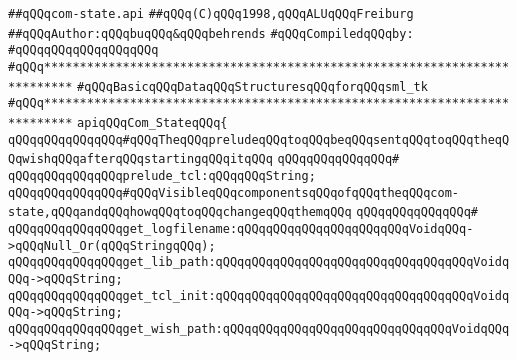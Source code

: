 \label{src/lib/tk/src/com-state.api}
\verb|##qQQqcom-state.api|\newline
\verb|##qQQq(C)qQQq1998,qQQqALUqQQqFreiburg|\newline
\verb|##qQQqAuthor:qQQqbuqQQq&qQQqbehrends|\newline
\newline
\verb|#qQQqCompiledqQQqby:|\newline
\verb|#qQQqqQQqqQQqqQQqqQQq|\newline
\newline
\newline
\newline
\verb|#qQQq**************************************************************************|\newline
\verb|#qQQqBasicqQQqDataqQQqStructuresqQQqforqQQqsml_tk|\newline
\verb|#qQQq**************************************************************************|\newline
\newline
\newline
\newline
\verb|apiqQQqCom_StateqQQq{|\newline
\newline
\newline
\verb|qQQqqQQqqQQqqQQq#qQQqTheqQQqpreludeqQQqtoqQQqbeqQQqsentqQQqtoqQQqtheqQQqwishqQQqafterqQQqstartingqQQqitqQQq|\newline
\verb|qQQqqQQqqQQqqQQq#|\newline
\verb|qQQqqQQqqQQqqQQqprelude_tcl:qQQqqQQqString;|\newline
\newline
\verb|qQQqqQQqqQQqqQQq#qQQqVisibleqQQqcomponentsqQQqofqQQqtheqQQqcom-state,qQQqandqQQqhowqQQqtoqQQqchangeqQQqthemqQQq|\newline
\verb|qQQqqQQqqQQqqQQq#|\newline
\verb|qQQqqQQqqQQqqQQqget_logfilename:qQQqqQQqqQQqqQQqqQQqqQQqVoidqQQq->qQQqNull_Or(qQQqStringqQQq);|\newline
\verb|qQQqqQQqqQQqqQQqget_lib_path:qQQqqQQqqQQqqQQqqQQqqQQqqQQqqQQqqQQqVoidqQQq->qQQqString;|\newline
\verb|qQQqqQQqqQQqqQQqget_tcl_init:qQQqqQQqqQQqqQQqqQQqqQQqqQQqqQQqqQQqVoidqQQq->qQQqString;|\newline
\verb|qQQqqQQqqQQqqQQqget_wish_path:qQQqqQQqqQQqqQQqqQQqqQQqqQQqqQQqVoidqQQq->qQQqString;|\newline
